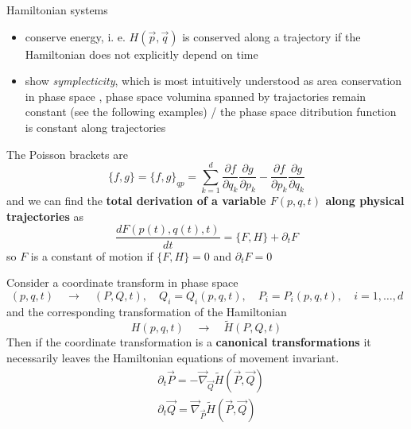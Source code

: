 Hamiltonian systems

\begin{itemize}
\item conserve energy, i. e. $H(\vec{p}, \vec{q})$ is conserved along a trajectory if the Hamiltonian does not explicitly depend on time
\item show \textit{symplecticity}, which is most intuitively understood as area conservation in phase space \cite{Hairer06}, phase space volumina spanned by trajactories remain constant (see the following examples) / the phase space ditribution function is constant along trajectories
\end{itemize}

The Poisson brackets are
\begin{equation}
  \{f, g\}=\{f, g\}_{q p}=\sum_{k=1}^d \frac{\partial f}{\partial q_k} \frac{\partial g}{\partial p_k}-\frac{\partial f}{\partial p_k} \frac{\partial g}{\partial q_k}
\end{equation}
and we can find the \textbf{total derivation of a variable $F(p,q,t)$ along physical trajectories} as
\begin{equation}
  \frac{dF(p(t),q(t),t)}{dt} = \{F, H\} + \partial_t F
\end{equation}
so $F$ is a constant of motion if $\{F, H\} = 0$ and $\partial_t F = 0$

Consider a coordinate transform in phase space
\begin{equation}
  (p,q,t) \quad \rightarrow \quad (P,Q,t), \quad Q_i = Q_i(p,q,t), \quad P_i = P_i(p,q,t), \quad i = 1,\dots,d
\end{equation}
and the corresponding transformation of the Hamiltonian
\begin{equation}
  H(p,q,t) \quad \rightarrow \quad \tilde{H}(P,Q,t)
\end{equation}
Then if the coordinate transformation is a \textbf{canonical transformations} it necessarily leaves the Hamiltonian
equations of movement invariant.
\begin{equation}
  \begin{aligned}
    & \partial_t \vec{P}=-\vec{\nabla}_{\vec{Q}} \tilde{H}(\vec{P},\vec{Q}) \\
    & \partial_t \vec{Q}=\vec{\nabla}_{\vec{P}} \tilde{H}(\vec{P},\vec{Q})
    \end{aligned}
\end{equation}

